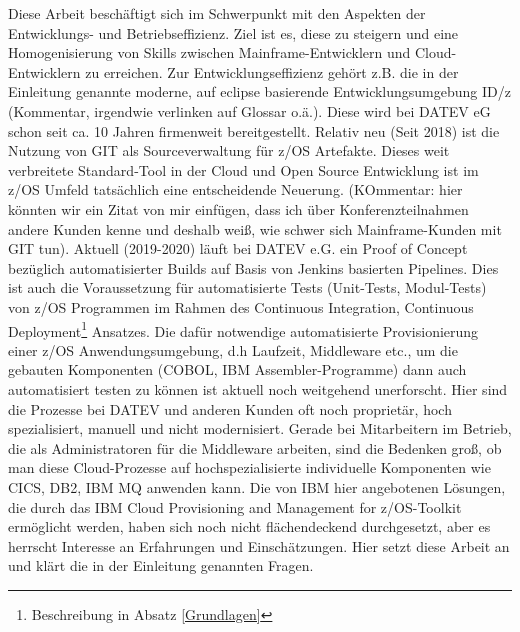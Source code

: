 Diese Arbeit beschäftigt sich im Schwerpunkt mit den Aspekten der Entwicklungs- und Betriebseffizienz. 
Ziel ist es, diese zu steigern und eine Homogenisierung von Skills zwischen Mainframe-Entwicklern und Cloud-Entwicklern zu erreichen. 
Zur Entwicklungseffizienz gehört z.B. die in der Einleitung genannte moderne, auf eclipse basierende Entwicklungsumgebung ID/z (Kommentar, irgendwie verlinken auf Glossar o.ä.).
Diese wird bei DATEV eG schon seit ca. 10 Jahren firmenweit bereitgestellt.
Relativ neu (Seit 2018) ist die Nutzung von GIT als Sourceverwaltung für z/OS Artefakte. 
Dieses weit verbreitete Standard-Tool in der Cloud und Open Source Entwicklung ist im z/OS Umfeld tatsächlich eine entscheidende Neuerung. (KOmmentar: hier könnten wir ein Zitat von mir einfügen, dass ich über Konferenzteilnahmen andere Kunden kenne und deshalb weiß, wie schwer sich Mainframe-Kunden mit GIT tun). 
Aktuell (2019-2020) läuft bei DATEV e.G. ein Proof of Concept bezüglich automatisierter Builds auf Basis von Jenkins basierten Pipelines.
Dies ist auch die Voraussetzung für automatisierte Tests (Unit-Tests, Modul-Tests) von z/OS Programmen im Rahmen des \glqq Continuous Integration, Continuous Deployment\grqq{}\footnote{Beschreibung in Absatz \ref{Grundlagen}} Ansatzes.
Die dafür notwendige automatisierte Provisionierung einer z/OS Anwendungsumgebung, d.h Laufzeit, Middleware etc., um die gebauten Komponenten (COBOL, IBM Assembler-Programme) dann auch automatisiert testen zu können ist aktuell noch weitgehend unerforscht. 
Hier sind die Prozesse bei DATEV und anderen Kunden oft noch proprietär, hoch spezialisiert,  manuell und  nicht modernisiert. 
Gerade bei Mitarbeitern im Betrieb, die als Administratoren für die Middleware arbeiten, sind die Bedenken groß, ob man diese Cloud-Prozesse auf hochspezialisierte individuelle Komponenten wie CICS, DB2, IBM MQ anwenden kann.
Die von IBM hier angebotenen Lösungen, die durch das \glqq IBM Cloud Provisioning and Management for z/OS\grqq-Toolkit ermöglicht werden, haben sich noch nicht flächendeckend durchgesetzt, aber es herrscht Interesse an Erfahrungen und Einschätzungen.
Hier setzt diese Arbeit an und klärt die in der Einleitung genannten Fragen.


